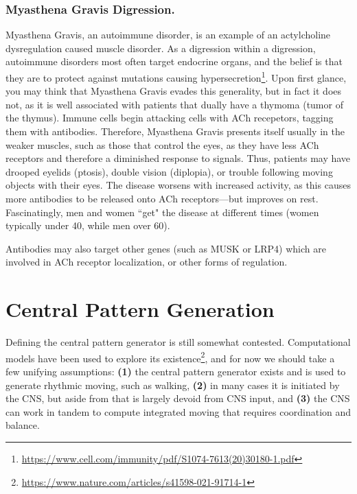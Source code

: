 \documentclass[12pt]{report}
\begin{document}
\subsubsection{Myasthena Gravis Digression.}
Myasthena Gravis, an autoimmune disorder, is an example of an actylcholine dysregulation caused muscle disorder. As a digression within a digression, autoimmune disorders most often target endocrine organs, and the belief is that they are to protect against mutations causing hypersecretion\footnote{\url{https://www.cell.com/immunity/pdf/S1074-7613(20)30180-1.pdf}}. Upon first glance, you may think that Myasthena Gravis evades this generality, but in fact it does not, as it is well associated with patients that dually have a thymoma (tumor of the thymus). Immune cells begin attacking cells with ACh recepetors, tagging them with antibodies. Therefore, Myasthena Gravis presents itself usually in the weaker muscles, such as those that control the eyes, as they have less ACh receptors and therefore a diminished response to signals. Thus, patients may have drooped eyelids (ptosis), double vision (diplopia), or trouble following moving objects with their eyes. The disease worsens with increased activity, as this causes more antibodies to be released onto ACh receptors---but improves on rest. Fascinatingly, men and women ``get" the disease at different times (women typically under 40, while men over 60).\newline

Antibodies may also target other genes (such as MUSK or LRP4) which are involved in ACh receptor localization, or other forms of regulation.



\section{Central Pattern Generation}

Defining the central pattern generator is still somewhat contested. Computational models have been used to explore its existence\footnote{\url{https://www.nature.com/articles/s41598-021-91714-1}}, and for now we should take a few unifying assumptions: \textbf{(1)} the central pattern generator exists and is used to generate rhythmic moving, such as walking, \textbf{(2)} in many cases it is initiated by the CNS, but aside from that is largely devoid from CNS input, and \textbf{(3)} the CNS can work in tandem to compute integrated moving that requires coordination and balance. 
\end{document}
